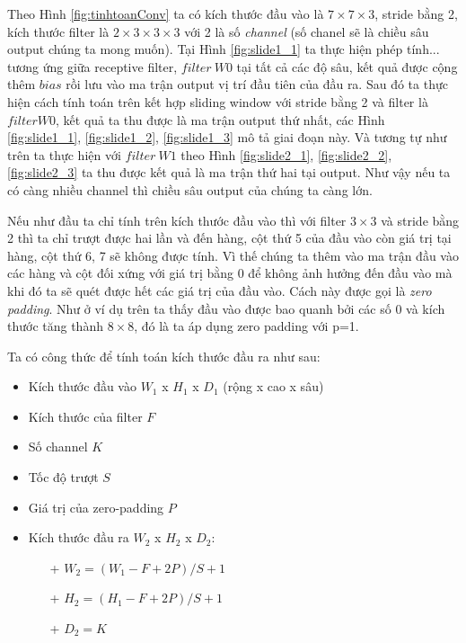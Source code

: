 Theo Hình \ref{fig:tinhtoanConv} ta có kích thước đầu vào là $7 \times 7\times 3$, stride bằng 2, kích thước filter là  $2\times 3\times 3 \times 3$ với 2 là số \textit{channel} (số chanel sẽ là chiều sâu output chúng ta mong muốn). Tại Hình \ref{fig:slide1_1} ta  thực hiện phép tính... tương ứng giữa receptive filter, $filter ~W0$ tại tất cả các độ sâu, kết quả được cộng thêm $bias$ rồi lưu vào ma trận output vị trí đầu tiên của đầu ra. Sau đó ta thực hiện cách tính toán trên kết hợp sliding window với stride bằng 2 và filter là $filter W0$, kết quả ta thu được là ma trận output thứ nhất, các Hình \ref{fig:slide1_1}, \ref{fig:slide1_2}, \ref{fig:slide1_3} mô tả giai đoạn này. Và tương tự như trên ta thực hiện với $filter ~W1$ theo Hình \ref{fig:slide2_1}, \ref{fig:slide2_2}, \ref{fig:slide2_3} ta thu được kết quả là ma trận thứ hai tại output. Như vậy nếu ta có càng nhiều channel thì chiều sâu output của chúng ta càng lớn. \par

Nếu như đầu ta chỉ tính trên kích thước đầu vào thì với filter $3\times 3$ và stride bằng 2 thì ta chỉ trượt được hai lần và đến hàng, cột thứ 5 của đầu vào còn giá trị tại hàng, cột thứ 6, 7 sẽ không được tính. Vì thế chúng ta thêm vào ma trận đầu vào các hàng và cột đối xứng với giá trị bằng 0 để không ảnh hưởng đến đầu vào mà khi đó ta sẽ quét được hết các giá trị của đầu vào. Cách này được gọi là \textit{zero padding}. Như ở ví dụ trên ta thấy đầu vào được bao quanh bởi các số 0 và kích thước tăng thành $8 \times 8$, đó là ta áp dụng zero padding với p=1.\par

Ta có công thức để tính toán kích thước đầu ra như sau:
\begin{itemize}
	\item Kích thước đầu vào \textbf{$W_1$} x \textbf{$H_1$} x \textbf{$D_1$} (rộng x cao x sâu)
	\item Kích thước của filter \textbf{$F$}
	\item Số channel \textbf{$K$}
	\item Tốc độ trượt \textbf{$S$}
	\item Giá trị của zero-padding \textbf{$P$}
	\item Kích thước đầu ra \textbf{$W_2$} x \textbf{$H_2$} x \textbf{$D_2$}:
	\begin{itemize}
		\item[+]  \textbf{$W_2 = (W_1 - F+ 2P)/S +1$}
		\item[+] \textbf{$H_2 = (H_1 - F+ 2P)/S +1$}
		\item[+] \textbf{$D_2 = K$}
	\end{itemize}	 
\end{itemize}	

